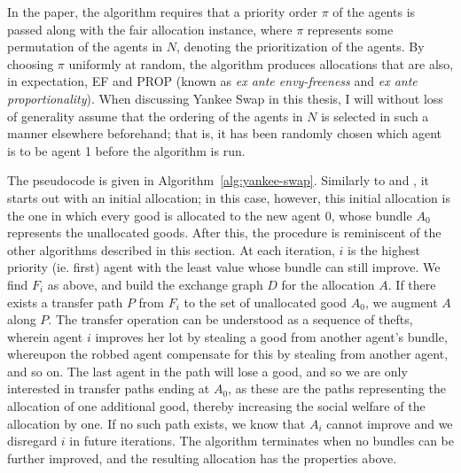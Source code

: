 In the paper, the algorithm requires that a priority order $\pi$ of the agents is passed along with the fair allocation instance, where $\pi$ represents some permutation of the agents in $N$, denoting the prioritization of the agents. By choosing $\pi$ uniformly at random, the algorithm produces allocations that are also, in expectation, EF and PROP (known as \textit{ex ante envy-freeness} and \textit{ex ante proportionality}). When discussing Yankee Swap in this thesis, I will without loss of generality assume that the ordering of the agents in $N$ is selected in such a manner elsewhere beforehand; that is, it has been randomly chosen which agent is to be agent 1 before the algorithm is run.

The pseudocode is given in Algorithm~\ref{alg:yankee-swap}. Similarly to  and , it starts out with an initial allocation; in this case, however, this initial allocation is the one in which every good is allocated to the new agent $0$, whose bundle $A_0$ represents the unallocated goods. After this, the procedure is reminiscent of the other algorithms described in this section. At each iteration, $i$ is the highest priority (ie. first) agent with the least value whose bundle can still improve. We find $F_i$ as above, and build the exchange graph $D$ for the allocation $A$. If there exists a transfer path $P$ from $F_i$ to the set of unallocated good $A_0$, we augment $A$ along $P$. The transfer operation can be understood as a sequence of thefts, wherein agent $i$ improves her lot by stealing a good from another agent's bundle, whereupon the robbed agent compensate for this by stealing from another agent, and so on. The last agent in the path will lose a good, and so we are only interested in transfer paths ending at $A_0$, as these are the paths representing the allocation of one additional good, thereby increasing the social welfare of the allocation by one. If no such path exists, we know that $A_i$ cannot improve and we disregard $i$ in future iterations. The algorithm terminates when no bundles can be further improved, and the resulting allocation has the properties above.

